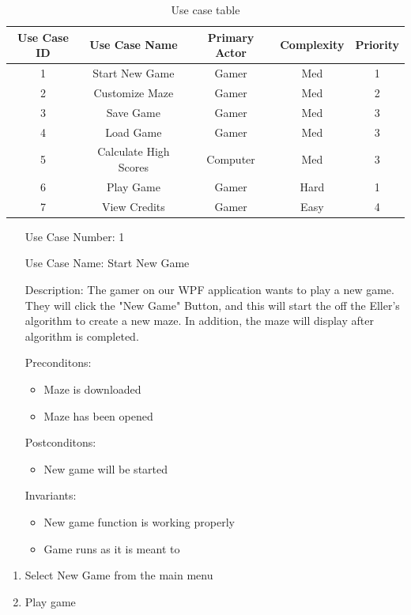 \documentclass[10pt,conference,onecolumn,compsoc]{IEEEtran}
\begin{document}
\begin{table}
\centering
\begin{tabular}{|c|c|c|c|c|}
\hline
Use Case ID & Use Case Name & Primary Actor & Complexity & Priority \\
\hline \hline
1 & Start New Game & Gamer & Med & 1\\
2 & Customize Maze & Gamer & Med & 2\\
3 & Save Game & Gamer & Med & 3\\
4 & Load Game & Gamer & Med  &3\\
5 & Calculate High Scores & Computer & Med & 3\\
6 & Play Game & Gamer & Hard & 1\\
7 & View Credits & Gamer & Easy & 4\\
\hline

\end{tabular}
\caption{Use case table}
\label{tab:useCaseIndex}
\end{table}


\begin{itemize}
\item[Use Case Number:] 1
\item[Use Case Name:] Start New Game 
\item[Description:] The gamer on our WPF application wants to play a new game. They will click the "New Game" Button, and this will start the off the Eller's algorithm to create a new maze. In addition, the maze will display after algorithm is completed. 
\item[Preconditons:]
\begin{itemize} 
\item Maze is downloaded
\item Maze has been opened
\end{itemize}

\item[Postconditons:]
\begin{itemize} 
\item New game will be started
\end{itemize}
\item[Invariants:]
\begin{itemize} 
\item New game function is working properly
\item Game runs as it is meant to
\end{itemize}
\end{itemize}


\begin{enumerate}
\item Select New Game from the main menu
\item Play game
\end{enumerate}
\end{document}
